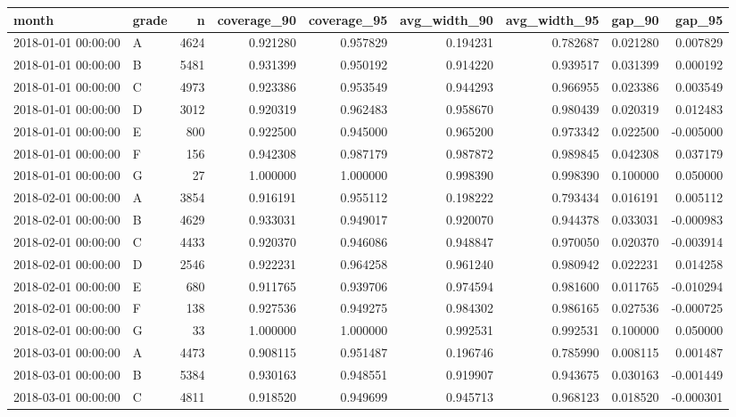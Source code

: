 \begin{tabular}{llrrrrrrr}
\toprule
month & grade & n & coverage_90 & coverage_95 & avg_width_90 & avg_width_95 & gap_90 & gap_95 \\
\midrule
2018-01-01 00:00:00 & A & 4624 & 0.921280 & 0.957829 & 0.194231 & 0.782687 & 0.021280 & 0.007829 \\
2018-01-01 00:00:00 & B & 5481 & 0.931399 & 0.950192 & 0.914220 & 0.939517 & 0.031399 & 0.000192 \\
2018-01-01 00:00:00 & C & 4973 & 0.923386 & 0.953549 & 0.944293 & 0.966955 & 0.023386 & 0.003549 \\
2018-01-01 00:00:00 & D & 3012 & 0.920319 & 0.962483 & 0.958670 & 0.980439 & 0.020319 & 0.012483 \\
2018-01-01 00:00:00 & E & 800 & 0.922500 & 0.945000 & 0.965200 & 0.973342 & 0.022500 & -0.005000 \\
2018-01-01 00:00:00 & F & 156 & 0.942308 & 0.987179 & 0.987872 & 0.989845 & 0.042308 & 0.037179 \\
2018-01-01 00:00:00 & G & 27 & 1.000000 & 1.000000 & 0.998390 & 0.998390 & 0.100000 & 0.050000 \\
2018-02-01 00:00:00 & A & 3854 & 0.916191 & 0.955112 & 0.198222 & 0.793434 & 0.016191 & 0.005112 \\
2018-02-01 00:00:00 & B & 4629 & 0.933031 & 0.949017 & 0.920070 & 0.944378 & 0.033031 & -0.000983 \\
2018-02-01 00:00:00 & C & 4433 & 0.920370 & 0.946086 & 0.948847 & 0.970050 & 0.020370 & -0.003914 \\
2018-02-01 00:00:00 & D & 2546 & 0.922231 & 0.964258 & 0.961240 & 0.980942 & 0.022231 & 0.014258 \\
2018-02-01 00:00:00 & E & 680 & 0.911765 & 0.939706 & 0.974594 & 0.981600 & 0.011765 & -0.010294 \\
2018-02-01 00:00:00 & F & 138 & 0.927536 & 0.949275 & 0.984302 & 0.986165 & 0.027536 & -0.000725 \\
2018-02-01 00:00:00 & G & 33 & 1.000000 & 1.000000 & 0.992531 & 0.992531 & 0.100000 & 0.050000 \\
2018-03-01 00:00:00 & A & 4473 & 0.908115 & 0.951487 & 0.196746 & 0.785990 & 0.008115 & 0.001487 \\
2018-03-01 00:00:00 & B & 5384 & 0.930163 & 0.948551 & 0.919907 & 0.943675 & 0.030163 & -0.001449 \\
2018-03-01 00:00:00 & C & 4811 & 0.918520 & 0.949699 & 0.945713 & 0.968123 & 0.018520 & -0.000301 \\

\end{tabular}
